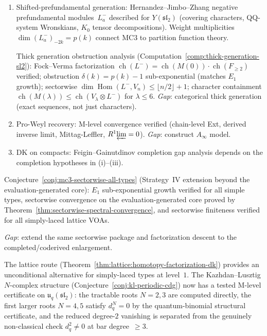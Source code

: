 \begin{remark}
\begin{enumerate}[label=\textup{(\roman*)},nosep]
\item Shifted-prefundamental generation: Hernandez--Jimbo--Zhang
  negative prefundamental modules~$L^-_a$ described for
  $Y(\mathfrak{sl}_2)$ (covering characters,
  QQ-system Wronskians, $K_0$ tensor decompositions).
  Weight multiplicities $\dim(L^-_a)_{-2k} = p(k)$ connect
  MC3 to partition function theory.

  Thick generation obstruction analysis (Computation~\ref{comp:thick-generation-sl2}):
  Fock--Verma factorization $\operatorname{ch}(L^-)
  = \operatorname{ch}(M(0)) \cdot \operatorname{ch}(F_{\geq 2})$
  verified; obstruction $\delta(k) = p(k)-1$ sub-exponential
  (matches $E_1$ growth); sectorwise $\dim\operatorname{Hom}(L^-,
  V_n) \leq \lfloor n/2\rfloor + 1$; character containment
  $\operatorname{ch}(M(\lambda)) \leq \operatorname{ch}(V_\lambda
  \otimes L^-)$ for $\lambda \leq 6$.
  \emph{Gap}: categorical thick generation (exact sequences, not
  just characters).

\item Pro-Weyl recovery: M-level convergence verified
  (chain-level Ext, derived inverse limit,
  Mittag-Leffler, $R^1\!\varprojlim = 0$).
  \emph{Gap}: construct $A_\infty$ model.

\item DK on compacts: Feigin--Gainutdinov completion gap analysis
  depends on the completion hypotheses in \textup{(i)--(iii)}.
\end{enumerate}

Conjecture~\ref{conj:mc3-sectorwise-all-types} \textup{(}Strategy~IV
extension beyond the evaluation-generated core\textup{)}:
$E_1$ sub-exponential growth verified for all simple types, sectorwise convergence on the evaluation-generated
core proved by
Theorem~\ref{thm:sectorwise-spectral-convergence}, and sectorwise
finiteness verified for all simply-laced lattice VOAs.

\emph{Gap}: extend the same sectorwise package and factorization
descent to the completed/coderived enlargement.

The lattice route
\textup{(}Theorem~\ref{thm:lattice:homotopy-factorization-dk}\textup{)}
provides an unconditional alternative for simply-laced types at
level~$1$.  The Kazhdan--Lusztig $N$-complex structure
\textup{(}Conjecture~\ref{conj:kl-periodic-cdg}\textup{)} now has a
tested M-level certificate on
$\mathfrak{u}_q(\mathfrak{sl}_2)$: the tractable roots
$N=2,3$ are computed directly, the first larger roots $N=4,5$ satisfy
$d_q^N=0$ by the quantum-binomial structural certificate, and the
reduced degree-$2$ vanishing is separated from the genuinely
non-classical check $d_q^2\neq0$ at bar degree~$\ge3$.


\end{remark}
